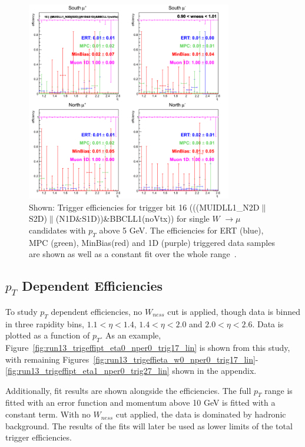 \begin{figure}[ht]
  \centering
  \includegraphics[width=0.8\textwidth]{./figures/run13_trigeffieta_w1_trig16_lin.png}
  \caption{
    Shown: Trigger efficiencies for trigger bit 16
    (((MUIDLL1\_N2D$\|$S2D)$\|$(N1D\&S1D))\&BBCLL1(noVtx)) for single $W$
    $\rightarrow \mu$ candidates with $p_T$ above 5 GeV. The
    efficiencies for ERT (blue), MPC (green), MinBias(red) and 1D (purple)
    triggered data samples are shown as well as a constant fit over the whole
    range~\cite{Seidl2014}.
  }
  \label{fig:run13_trigeffieta_w0_nper0_trig16_lin} 
\end{figure}

\clearpage
\subsection{$p_T$ Dependent Efficiencies}
To study $p_T$ dependent efficiencies, no $W_{ness}$ cut is
applied, though data is binned in three rapidity bins, $1.1 < \eta < 1.4$, $1.4
< \eta < 2.0$ and $2.0 < \eta < 2.6 $. Data is plotted as a function of $p_T$.
As an example, Figure~\ref{fig:run13_trigeffipt_eta0_nper0_trig17_lin} is shown
from this study, with remaining
Figures~\ref{fig:run13_trigeffieta_w0_nper0_trig17_lin}-\ref{fig:run13_trigeffipt_eta1_nper0_trig27_lin}
shown in the appendix.

Additionally, fit results are shown alongside the efficiencies. The full $p_T$
range is fitted with an error function and momentum above 10 GeV is fitted with
a constant term. With no $W_{ness}$ cut applied, the data is dominated by
hadronic background. The results of the fits will later be used as lower limits
of the total trigger efficiencies. 

